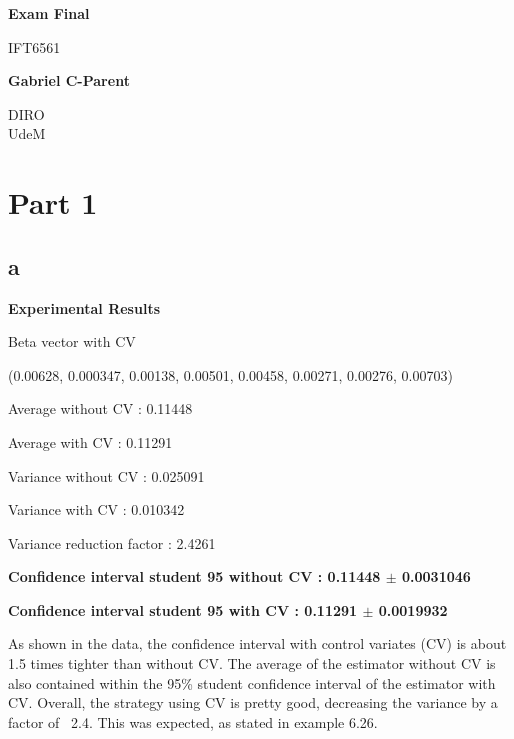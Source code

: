 \documentclass[12pt]{report}
\begin{document}
 
    \begin{center}
        \vspace*{1cm}
        
        \textbf{Exam Final}
        
        \vspace{1.5cm}
		IFT6561
        
        \vspace{2.5cm}
        
        \textbf{Gabriel C-Parent}
        
        \vfill

        
        \vspace{0.8cm}

        DIRO\\
        UdeM\\
        \vfill
    \end{center}
\vfill
\newpage



\section*{Part 1}


\subsection*{a}
\textbf{Experimental Results}
\vspace{1 cm}

Beta vector with CV

(0.00628, 0.000347, 0.00138, 0.00501, 0.00458, 0.00271, 0.00276, 0.00703)

Average without CV                         :  0.11448

Average with CV                            :  0.11291

Variance without CV                        : 0.025091

Variance with CV                           : 0.010342

Variance reduction factor                  :   2.4261

\textbf{Confidence interval student 95 without CV  :  0.11448 $\pm$ 0.0031046}

\textbf{Confidence interval student 95 with CV     :  0.11291 $\pm$ 0.0019932}


\vspace{0.5 cm}

As shown in the data, the confidence interval with control variates (CV) is about 1.5 times tighter than without CV. The average of the estimator without CV is also contained within the 95\% student confidence interval of the estimator with CV. Overall, the strategy using CV is pretty good, decreasing the variance by a factor of ~2.4. This was expected, as stated in example 6.26.
\end{document}
